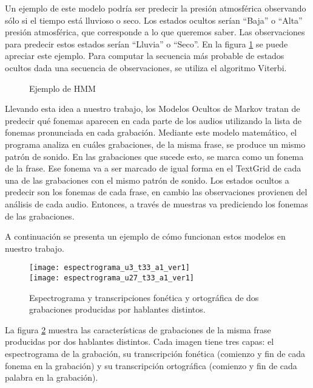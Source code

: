 Un ejemplo de este modelo podría ser predecir la presión atmosférica observando sólo si el tiempo está lluvioso o seco. Los estados ocultos serían ``Baja'' o ``Alta'' presión atmosférica, que corresponde a lo que queremos saber. Las observaciones para predecir estos estados serían ``Lluvia'' o ``Seco''. En la figura \ref{ex_hmm} se puede apreciar este ejemplo. Para computar la secuencia más probable de estados ocultos dada una secuencia de observaciones, se utiliza el algoritmo Viterbi.

\begin{figure}[htbp]
	\begin{center}
	\end{center}
	\caption{Ejemplo de HMM}
	\label{ex_hmm}
\end{figure}

Llevando esta idea a nuestro trabajo, los Modelos Ocultos de Markov tratan de predecir qué fonemas aparecen en cada parte de los audios utilizando la lista de fonemas pronunciada en cada grabación. Mediante este modelo matemático, el programa analiza en cuáles grabaciones, de la misma frase, se produce un mismo patrón de sonido. En las grabaciones que sucede esto, se marca como un fonema de la frase. Ese fonema va a ser marcado de igual forma en el TextGrid de cada una de las grabaciones con el mismo patrón de sonido. Los estados ocultos a predecir son los fonemas de cada frase, en cambio las observaciones provienen del análisis de cada audio. Entonces, a través de muestras va prediciendo los fonemas de las grabaciones.

A continuación se presenta un ejemplo de cómo funcionan estos modelos en nuestro trabajo. 
%
\begin{figure}[h]
	\centering
	\texttt{[image: espectrograma\_u3\_t33\_a1\_ver1]} \\
	\smallskip
	\texttt{[image: espectrograma\_u27\_t33\_a1\_ver1]} 
	\caption{Espectrograma y transcripciones fonética y ortográfica de dos grabaciones producidas por hablantes distintos.}
	\label{car_a1}
\end{figure}
%
La figura \ref{car_a1} muestra las características de grabaciones de la misma frase producidas por dos hablantes distintos. Cada imagen tiene tres capas: el espectrograma de la grabación, su transcripción fonética (comienzo y fin de cada fonema en la grabación) y su transcripción ortográfica (comienzo y fin de cada palabra en la grabación).

